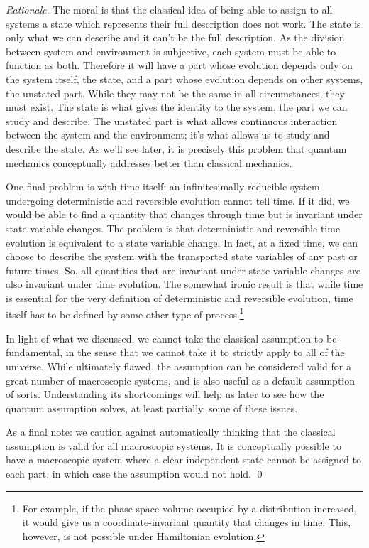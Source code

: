 \documentclass[aps,pra,10pt,twocolumn,floatfix,nofootinbib]{revtex4-1}
\numberwithin{equation}{section}
\theoremstyle{definition}
\newenvironment{rationale}{\emph{Rationale}.}{\qed}
\begin{document}
\begin{rationale}
	The moral is that the classical idea of being able to assign to all systems a state which represents their full description does not work. The state is only what we can describe and it can't be the full description. As the division between system and environment is subjective, each system must be able to function as both. Therefore it will have a part whose evolution depends only on the system itself, the state, and a part whose evolution depends on other systems, the unstated part. While they may not be the same in all circumstances, they must exist. The state is what gives the identity to the system, the part we can study and describe. The unstated part is what allows continuous interaction between the system and the environment; it's what allows us to study and describe the state. As we'll see later, it is precisely this problem that quantum mechanics conceptually addresses better than classical mechanics.
	
	One final problem is with time itself: an infinitesimally reducible system undergoing deterministic and reversible evolution cannot tell time. If it did, we would be able to find a quantity that changes through time but is invariant under state variable changes. The problem is that deterministic and reversible time evolution is equivalent to a state variable change. In fact, at a fixed time, we can choose to describe the system with the transported state variables of any past or future times. So, all quantities that are invariant under state variable changes are also invariant under time evolution. The somewhat ironic result is that while time is essential for the very definition of deterministic and reversible evolution, time itself has to be defined by some other type of process.\footnote{For example, if the phase-space volume occupied by a distribution increased, it would give us a coordinate-invariant quantity that changes in time. This, however, is not possible under Hamiltonian evolution.}
	
	In light of what we discussed, we cannot take the classical assumption to be fundamental, in the sense that we cannot take it to strictly apply to all of the universe. While ultimately flawed, the  assumption can be considered valid for a great number of macroscopic systems, and is also useful as a default assumption of sorts. Understanding its shortcomings will help us later to see how the quantum assumption solves, at least partially, some of these issues.
	
	As a final note: we caution against automatically thinking that the classical assumption is valid for all macroscopic systems. It is conceptually possible to have a macroscopic system where a clear independent state cannot be assigned to each part, in which case the assumption would not hold.
\end{rationale}
\end{document}
